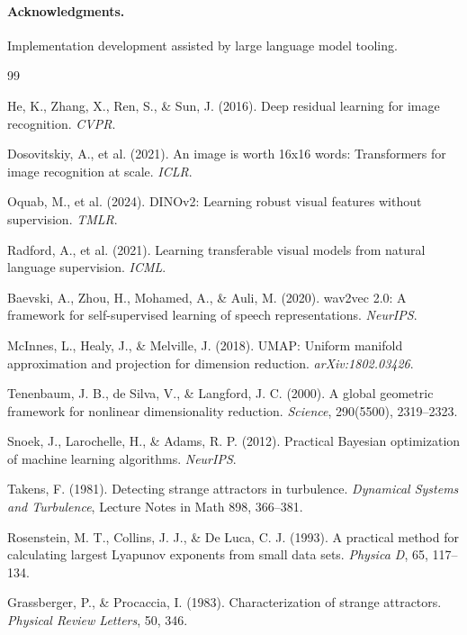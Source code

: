\documentclass[11pt,a4paper]{article}
\begin{document}
\paragraph{Acknowledgments.}
Implementation development assisted by large language model
tooling.


\begin{thebibliography}{99}

He, K., Zhang, X., Ren, S., \& Sun, J. (2016). Deep residual
learning for image recognition. \emph{CVPR}.

Dosovitskiy, A., et al. (2021). An image is worth 16x16 words:
Transformers for image recognition at scale. \emph{ICLR}.

Oquab, M., et al. (2024). DINOv2: Learning robust visual features
without supervision. \emph{TMLR}.

Radford, A., et al. (2021). Learning transferable visual models from
natural language supervision. \emph{ICML}.

Baevski, A., Zhou, H., Mohamed, A., \& Auli, M. (2020). wav2vec 2.0:
A framework for self-supervised learning of speech representations.
\emph{NeurIPS}.

McInnes, L., Healy, J., \& Melville, J. (2018). UMAP: Uniform
manifold approximation and projection for dimension reduction.
\emph{arXiv:1802.03426}.

Tenenbaum, J. B., de Silva, V., \& Langford, J. C. (2000). A global
geometric framework for nonlinear dimensionality reduction.
\emph{Science}, 290(5500), 2319--2323.

Snoek, J., Larochelle, H., \& Adams, R. P. (2012). Practical Bayesian
optimization of machine learning algorithms. \emph{NeurIPS}.

Takens, F. (1981). Detecting strange attractors in turbulence.
\emph{Dynamical Systems and Turbulence}, Lecture Notes in Math 898,
366--381.

Rosenstein, M. T., Collins, J. J., \& De Luca, C. J. (1993). A
practical method for calculating largest Lyapunov exponents from
small data sets. \emph{Physica D}, 65, 117--134.

Grassberger, P., \& Procaccia, I. (1983). Characterization of strange
attractors. \emph{Physical Review Letters}, 50, 346.


\end{thebibliography}
\end{document}
